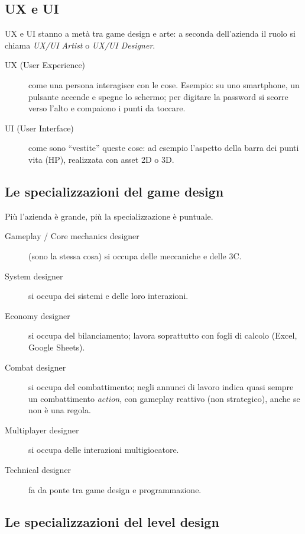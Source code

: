 \subsection{UX e UI}

UX e UI stanno a metà tra game design e arte: a seconda dell'azienda il ruolo
si chiama \emph{UX/UI Artist} o \emph{UX/UI Designer}.
\begin{description}
  \item[UX (User Experience)] come una persona interagisce con le cose. Esempio:
        su uno smartphone, un pulsante accende e spegne lo schermo; per
        digitare la password si scorre verso l'alto e compaiono i punti da
        toccare.
  \item[UI (User Interface)] come sono ``vestite'' queste cose: ad esempio
        l'aspetto della barra dei punti vita (HP), realizzata con asset 2D o
        3D.
\end{description}

\subsection{Le specializzazioni del game design}

Più l'azienda è grande, più la specializzazione è puntuale.
\begin{description}
  \item[Gameplay / Core mechanics designer] (sono la stessa cosa) si occupa
        delle meccaniche e delle 3C.
  \item[System designer] si occupa dei sistemi e delle loro interazioni.
  \item[Economy designer] si occupa del bilanciamento; lavora soprattutto con
        fogli di calcolo (Excel, Google Sheets).
  \item[Combat designer] si occupa del combattimento; negli annunci di lavoro
        indica quasi sempre un combattimento \emph{action}, con gameplay
        reattivo (non strategico), anche se non è una regola.
  \item[Multiplayer designer] si occupa delle interazioni multigiocatore.
  \item[Technical designer] fa da ponte tra game design e programmazione.
\end{description}

\subsection{Le specializzazioni del level design}

